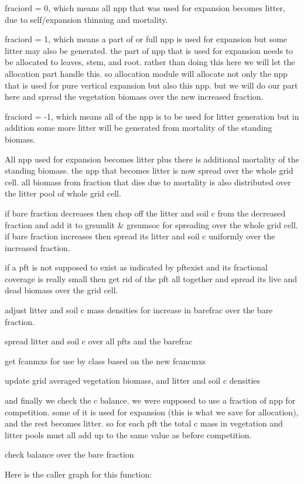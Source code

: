 \begin{DoxyEnumerate}
\item fraciord = 0, which means all npp that was used for expansion becomes litter, due to self/expansion thinning and mortality.
\item fraciord = 1, which means a part of or full npp is used for expansion but some litter may also be generated. the part of npp that is used for expansion needs to be allocated to leaves, stem, and root. rather than doing this here we will let the allocation part handle this. so allocation module will allocate not only the npp that is used for pure vertical expansion but also this npp. but we will do our part here and spread the vegetation biomass over the new increased fraction.
\item fraciord = -\/1, which means all of the npp is to be used for litter generation but in addition some more litter will be generated from mortality of the standing biomass.
\end{DoxyEnumerate}

All npp used for expansion becomes litter plus there is additional mortality of the standing biomass. the npp that becomes litter is now spread over the whole grid cell. all biomass from fraction that dies due to mortality is also distributed over the litter pool of whole grid cell.

if bare fraction decreases then chop off the litter and soil c from the decreased fraction and add it to grsumlit \& grsumsoc for spreading over the whole grid cell. if bare fraction increases then spread its litter and soil c uniformly over the increased fraction.

if a pft is not supposed to exist as indicated by pftexist and its fractional coverage is really small then get rid of the pft all together and spread its live and dead biomass over the grid cell.

adjust litter and soil c mass densities for increase in barefrac over the bare fraction.

spread litter and soil c over all pfts and the barefrac

get fcanmxs for use by class based on the new fcancmxs

update grid averaged vegetation biomass, and litter and soil c densities

and finally we check the c balance. we were supposed to use a fraction of npp for competition. some of it is used for expansion (this is what we save for allocation), and the rest becomes litter. so for each pft the total c mass in vegetation and litter pools must all add up to the same value as before competition.

check balance over the bare fraction 

Here is the caller graph for this function\+:


